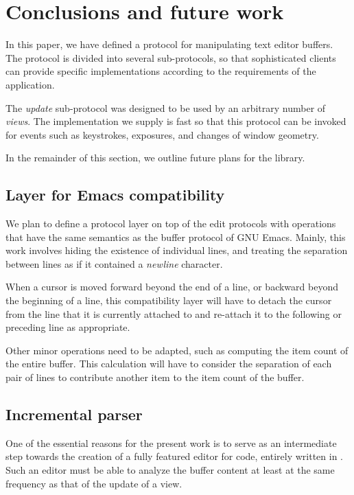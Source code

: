 \section{Conclusions and future work}

In this paper, we have defined a \clos{} protocol for manipulating
text editor buffers.  The protocol is divided into several
sub-protocols, so that sophisticated clients can provide specific
implementations according to the requirements of the application.

The \emph{update} sub-protocol was designed to be used by an arbitrary
number of \emph{views}.  The implementation we supply is fast so that
this protocol can be invoked for events such as keystrokes, exposures,
and changes of window geometry.

In the remainder of this section, we outline future plans for the
library.

\subsection{Layer for Emacs compatibility}

We plan to define a protocol layer on top of the edit protocols with
operations that have the same semantics as the buffer protocol of GNU
Emacs.  Mainly, this work involves hiding the existence of individual
lines, and treating the separation between lines as if it contained a
\emph{newline} character.

When a cursor is moved forward beyond the end of a line, or backward
beyond the beginning of a line, this compatibility layer will have to
detach the cursor from the line that it is currently attached to and
re-attach it to the following or preceding line as appropriate.

Other minor operations need to be adapted, such as computing the item
count of the entire buffer.  This calculation will have to consider
the separation of each pair of lines to contribute another item to the
item count of the buffer.

\subsection{Incremental \commonlisp{} parser}

One of the essential reasons for the present work is to serve as an
intermediate step towards the creation of a fully featured editor for
\commonlisp{} code, entirely written in \commonlisp{}.  Such an editor
must be able to analyze the buffer content at least at the same
frequency as that of the update of a view.

